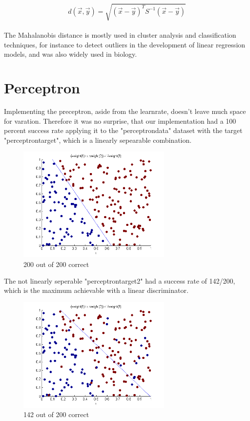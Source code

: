 \documentclass{article}
\begin{document}
\begin{equation}
d(\vec{x},\vec{y}) = \sqrt{(\vec{x}-\vec{y})^TS^{-1}(\vec{x}-\vec{y})}
\end{equation}
\\
The Mahalanobis distance is mostly used in cluster analysis and classification techniques, for instance to detect outliers in the development of linear regression models, and was also widely used in biology.
\pagebreak

\section{Perceptron}

Implementing the preceptron, aside from the learnrate, doesn't leave much space for varation. Therefore it was no surprise, that our implementation had a 100 percent success rate applying it to the "perceptrondata" dataset with the target "perceptrontarget", which is a linearly sepearable combination. 

\begin{figure}
    \centering
    \includegraphics[width=3.0in]{200_of_200_correct}
    \caption{200 out of 200 correct}
    \label{200of200correct}
\end{figure}

The not linearly seperable "perceptrontarget2" had a success rate of 142/200, which is the maximum achievable with a linear discriminator.

\begin{figure}
    \centering
    \includegraphics[width=3.0in]{142_of_200_correct}
    \caption{142 out of 200 correct}
    \label{142of200correct}
\end{figure}
\end{document}
